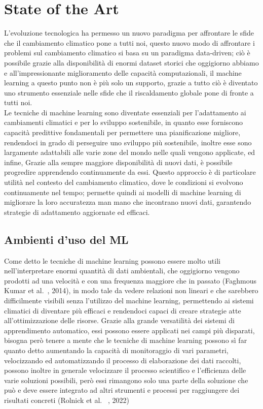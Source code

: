 \chapter{State of the Art}
L'evoluzione tecnologica ha permesso un nuovo paradigma per affrontare le sfide che il cambiamento climatico pone a tutti noi, questo nuovo modo di affrontare i problemi sul cambiamento climatico si basa su un paradigma data-driven; ciò è possibile grazie alla disponibilità di enormi dataset storici che oggigiorno abbiamo e all'impressionante miglioramento delle capacità computazionali, il machine learning  a questo punto non è più solo un supporto, grazie a tutto ciò è diventato uno strumento essenziale nelle sfide che il riscaldamento globale pone di fronte a tutti noi.\\
Le tecniche di machine learning sono diventate essenziali per l'adattamento ai cambiamenti climatici e per lo sviluppo sostenibile, in quanto esse forniscono capacità predittive fondamentali per permettere una pianificazione migliore, rendendoci in grado di perseguire uno sviluppo più sostenibile, inoltre esse sono largamente adattabili alle varie zone del mondo nelle quali vengono applicate, ed infine, Grazie alla sempre maggiore disponibilità di nuovi dati, è possibile progredire apprendendo continuamente da essi. Questo approccio è di particolare utilità nel contesto del cambiamento climatico, dove le condizioni si evolvono continuamente nel tempo; permette quindi ai modelli di machine learning di migliorare la loro accuratezza man mano che incontrano nuovi dati, garantendo strategie di adattamento aggiornate ed efficaci.

\section{Ambienti d'uso del ML}
Come detto le tecniche di machine learning possono essere molto utili nell'interpretare enormi quantità di dati ambientali, che oggigiorno vengono prodotti ad una velocità e con una frequenza maggiore che in passato (Faghmous Kumar et al.~\cite{faghmous2014bigdata}, 2014), in modo tale da vedere relazioni non lineari e che sarebbero difficilmente visibili senza l'utilizzo del machine learning, permettendo ai sistemi climatici di diventare più efficaci e rendendoci capaci di creare strategie atte all'ottimizzazione delle risorse. Grazie alla grande versatilità dei sistemi di apprendimento automatico, essi possono essere applicati nei campi più disparati, bisogna però tenere a mente che le tecniche di machine learning possono sì far quanto detto aumentando la capacità di monitoraggio di vari parametri, velocizzando ed automatizzando il processo di elaborazione dei dati raccolti, possono inoltre in generale velocizzare il processo scientifico e l'efficienza delle varie soluzioni possibili, però essi rimangono solo una parte della soluzione che può e deve essere integrato ad altri strumenti e processi per raggiungere dei risultati concreti (Rolnick et al. ~\cite{rolnick2022tackling}, 2022)

